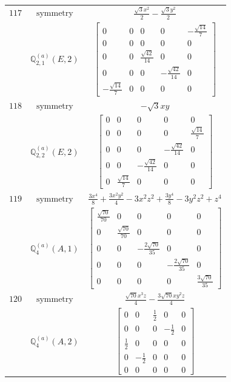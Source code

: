 \documentclass[fleqn,8pt,landscape]{jsarticle}
\begin{document}
\begin{longtable}{ccc}
$ 117 $ & $ \text{symmetry} $ & $ \frac{\sqrt{3} x^{2}}{2} - \frac{\sqrt{3} y^{2}}{2} $ \\
$  $ & $ \mathbb{Q}_{2,1}^{(a)}(E,2) $ & $ \begin{bmatrix} 0 & 0 & 0 & 0 & - \frac{\sqrt{14}}{7} \\ 0 & 0 & 0 & 0 & 0 \\ 0 & 0 & \frac{\sqrt{42}}{14} & 0 & 0 \\ 0 & 0 & 0 & - \frac{\sqrt{42}}{14} & 0 \\ - \frac{\sqrt{14}}{7} & 0 & 0 & 0 & 0 \end{bmatrix} $ \\ \hline
$ 118 $ & $ \text{symmetry} $ & $ - \sqrt{3} x y $ \\
$  $ & $ \mathbb{Q}_{2,2}^{(a)}(E,2) $ & $ \begin{bmatrix} 0 & 0 & 0 & 0 & 0 \\ 0 & 0 & 0 & 0 & \frac{\sqrt{14}}{7} \\ 0 & 0 & 0 & - \frac{\sqrt{42}}{14} & 0 \\ 0 & 0 & - \frac{\sqrt{42}}{14} & 0 & 0 \\ 0 & \frac{\sqrt{14}}{7} & 0 & 0 & 0 \end{bmatrix} $ \\ \hline
$ 119 $ & $ \text{symmetry} $ & $ \frac{3 x^{4}}{8} + \frac{3 x^{2} y^{2}}{4} - 3 x^{2} z^{2} + \frac{3 y^{4}}{8} - 3 y^{2} z^{2} + z^{4} $ \\
$  $ & $ \mathbb{Q}_{4}^{(a)}(A,1) $ & $ \begin{bmatrix} \frac{\sqrt{70}}{70} & 0 & 0 & 0 & 0 \\ 0 & \frac{\sqrt{70}}{70} & 0 & 0 & 0 \\ 0 & 0 & - \frac{2 \sqrt{70}}{35} & 0 & 0 \\ 0 & 0 & 0 & - \frac{2 \sqrt{70}}{35} & 0 \\ 0 & 0 & 0 & 0 & \frac{3 \sqrt{70}}{35} \end{bmatrix} $ \\ \hline
$ 120 $ & $ \text{symmetry} $ & $ \frac{\sqrt{70} x^{3} z}{4} - \frac{3 \sqrt{70} x y^{2} z}{4} $ \\
$  $ & $ \mathbb{Q}_{4}^{(a)}(A,2) $ & $ \begin{bmatrix} 0 & 0 & \frac{1}{2} & 0 & 0 \\ 0 & 0 & 0 & - \frac{1}{2} & 0 \\ \frac{1}{2} & 0 & 0 & 0 & 0 \\ 0 & - \frac{1}{2} & 0 & 0 & 0 \\ 0 & 0 & 0 & 0 & 0 \end{bmatrix} $ \\ \hline

\end{longtable}
\end{document}
